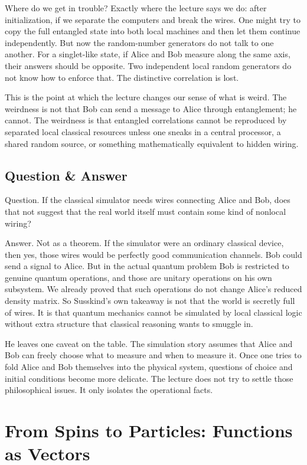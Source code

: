 Where do we get in trouble? Exactly where the lecture says we do: after initialization, if we separate the computers and break the wires. One might try to copy the full entangled state into both local machines and then let them continue independently. But now the random-number generators do not talk to one another. For a singlet-like state, if Alice and Bob measure along the same axis, their answers should be opposite. Two independent local random generators do not know how to enforce that. The distinctive correlation is lost.

This is the point at which the lecture changes our sense of what is weird. The weirdness is not that Bob can send a message to Alice through entanglement; he cannot. The weirdness is that entangled correlations cannot be reproduced by separated local classical resources unless one sneaks in a central processor, a shared random source, or something mathematically equivalent to hidden wiring.

\subsection{Question \& Answer}

Question. If the classical simulator needs wires connecting Alice and Bob, does that not suggest that the real world itself must contain some kind of nonlocal wiring?

Answer. Not as a theorem. If the simulator were an ordinary classical device, then yes, those wires would be perfectly good communication channels. Bob could send a signal to Alice. But in the actual quantum problem Bob is restricted to genuine quantum operations, and those are unitary operations on his own subsystem. We already proved that such operations do not change Alice's reduced density matrix. So Susskind's own takeaway is not that the world is secretly full of wires. It is that quantum mechanics cannot be simulated by local classical logic without extra structure that classical reasoning wants to smuggle in.

He leaves one caveat on the table. The simulation story assumes that Alice and Bob can freely choose what to measure and when to measure it. Once one tries to fold Alice and Bob themselves into the physical system, questions of choice and initial conditions become more delicate. The lecture does not try to settle those philosophical issues. It only isolates the operational facts.

\section{From Spins to Particles: Functions as Vectors}


